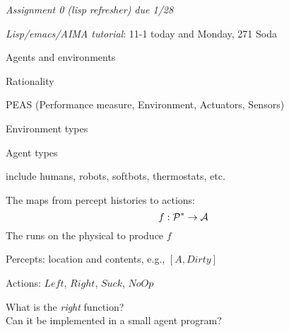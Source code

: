 \documentclass{article}
\begin{document}
\begin{huge}

\sf



\emph{Assignment 0 (lisp refresher) due 1/28}

\emph{Lisp/emacs/AIMA tutorial}: 11-1 today and Monday, 271 Soda





\blob Agents and environments

\blob Rationality

\blob PEAS (Performance measure, Environment, Actuators, Sensors)

\blob Environment types

\blob Agent types


\textwidth
{}

 include humans, robots, softbots, thermostats, etc.

The  maps from percept histories to actions:
\[f: {\cal P}^* \rightarrow {\cal A}\]
The  runs on the physical  to produce $f$




\vspace*{0.3in}

\textwidth
{}

Percepts: location and contents, e.g., $[A,Dirty]$

Actions: $Left$, $Right$, $Suck$, $NoOp$


%

\medskip



What is the \emph{right} function? \\
Can it be implemented in a small agent program?


\end{huge}
\end{document}
